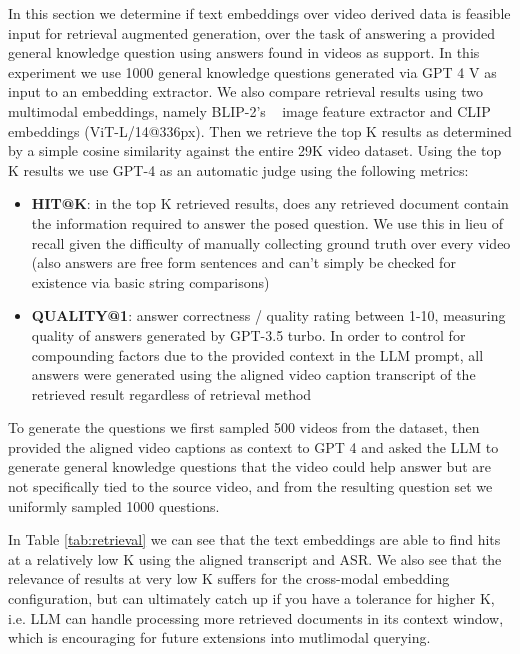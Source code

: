 \documentclass[sigconf]{acmart}
\begin{document}
\begin{CCSXML}
		
		In this section we determine if text embeddings over video derived data is feasible input for retrieval augmented generation, over the task of answering a provided general knowledge question using answers found in videos as support. In this experiment we use 1000 general knowledge questions generated via GPT 4 V as input to an embedding extractor. We also compare retrieval results using two multimodal embeddings, namely BLIP-2's ~\citep{li2023blip2} image feature extractor and CLIP ~\citep{Radford2021LearningTV} embeddings (ViT-L/14@336px). Then we retrieve the top K results as determined by a simple cosine similarity against the entire 29K video dataset. Using the top K results we use GPT-4 as an automatic judge using the following metrics:
		\begin{itemize}
			\item \textbf{HIT@K}: in the top K retrieved results, does any retrieved document contain the information required to answer the posed question. We use this in lieu of recall given the difficulty of manually collecting ground truth over every video (also answers are free form sentences and can't simply be checked for existence via basic string comparisons)
			\item \textbf{QUALITY@1}: answer correctness / quality rating between 1-10, measuring quality of answers generated by GPT-3.5 turbo. In order to control for compounding factors due to the provided context in the LLM prompt, all answers were generated using the aligned video caption transcript of the retrieved result regardless of retrieval method
		\end{itemize}
		
		To generate the questions we first sampled 500 videos from the dataset, then provided the aligned video captions as context to GPT 4 and asked the LLM to generate general knowledge questions that the video could help answer but are not specifically tied to the source video, and from the resulting question set we uniformly sampled 1000 questions.
		
		In Table \ref{tab:retrieval} we can see that the text embeddings are able to find hits at a relatively low K using the aligned transcript and ASR. We also see that the relevance of results at very low K suffers for the cross-modal embedding configuration, but can ultimately catch up if you have a tolerance for higher K, i.e. LLM can handle processing more retrieved documents in its context window, which is encouraging for future extensions into mutlimodal querying.
		

\end{CCSXML}
\end{document}
